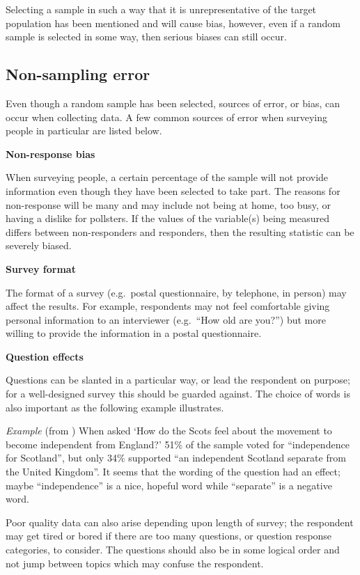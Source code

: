 \documentclass[
  oneside]{krantz}
\begin{document}
Selecting a sample in such a way that it is unrepresentative of the target population has been mentioned and will cause bias, however, even if a random sample is selected in some way, then serious biases can still occur.

\hypertarget{non-sampling-error}{%
\subsection{Non-sampling error}\label{non-sampling-error}}

Even though a random sample has been selected, sources of error, or bias, can occur when collecting data. A few common sources of error when surveying people in particular are listed below.

\textbf{Non-response bias}

When surveying people, a certain percentage of the sample will not provide information even though they have been selected to take part. The reasons for non-response will be many and may include not being at home, too busy, or having a dislike for pollsters. If the values of the variable(s) being measured differs between non-responders and responders, then the resulting statistic can be severely biased.

\textbf{Survey format}

The format of a survey (e.g.~postal questionnaire, by telephone, in person) may affect the results. For example, respondents may not feel comfortable giving personal information to an interviewer (e.g.~``How old are you?'') but more willing to provide the information in a postal questionnaire.

\textbf{Question effects}

Questions can be slanted in a particular way, or lead the respondent on purpose; for a well-designed survey this should be guarded against. The choice of words is also important as the following example illustrates.

\emph{Example} (from \citep{moore2003}) When asked `How do the Scots feel about the movement to become independent from England?' 51\% of the sample voted for ``independence for Scotland'', but only 34\% supported ``an independent Scotland separate from the United Kingdom''. It seems that the wording of the question had an effect; maybe ``independence'' is a nice, hopeful word while ``separate'' is a negative word.

Poor quality data can also arise depending upon length of survey; the respondent may get tired or bored if there are too many questions, or question response categories, to consider. The questions should also be in some logical order and not jump between topics which may confuse the respondent.
\end{document}
